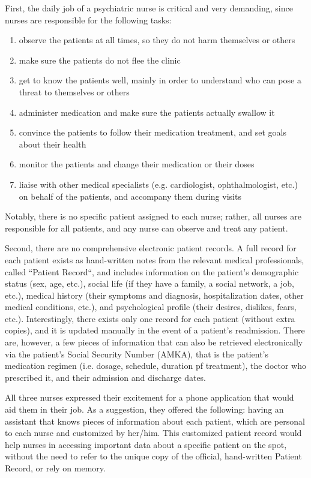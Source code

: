 First, the daily job of a psychiatric nurse is critical and very demanding, since nurses are responsible for the following tasks:
\begin{enumerate}
    \item observe the patients at all times, so they do not harm themselves or others
    \item make sure the patients do not flee the clinic
    \item get to know the patients well, mainly in order to understand who can pose a threat to themselves or others
    \item administer medication and make sure the patients actually swallow it
    \item convince the patients to follow their medication treatment, and set goals about their health 
    \item monitor the patients and change their medication or their doses
    \item liaise with other medical specialists (e.g. cardiologist, ophthalmologist, etc.) on behalf of the patients, and accompany them during visits
\end{enumerate}
Notably, there is no specific patient assigned to each nurse; rather, all nurses are responsible for all patients, and any nurse can observe and treat any patient.

Second, there are no comprehensive electronic patient records.  A full record for each patient exists as hand-written notes from the relevant medical professionals, called ``Patient Record``, and includes information on the patient's demographic status (sex, age, etc.), social life (if they have a family, a social network, a job, etc.), medical history (their symptoms and diagnosis, hospitalization dates, other medical conditions, etc.), and psychological profile (their desires, dislikes, fears, etc.). Interestingly, there exists only one record for each patient (without extra copies), and it is updated manually in the event of a patient's readmission. There are, however, a few pieces of information that can also be retrieved electronically via the patient's Social Security Number (AMKA), that is the patient's medication regimen (i.e. dosage, schedule, duration pf treatment), the doctor who prescribed it, and their admission and discharge dates. 

All three nurses expressed their excitement for a phone application that would aid them in their job. As a suggestion, they offered the following: having an assistant that knows pieces of information about each patient, which are personal to each nurse and customized by her/him. This customized patient record would help nurses in accessing important data about a specific patient on the spot, without the need to refer to the unique copy of the official, hand-written Patient Record, or rely on memory. 


